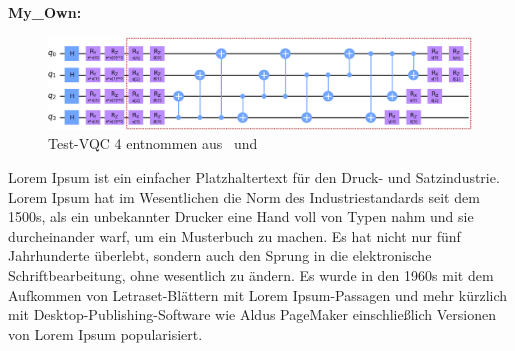 \textbf{My\_Own:}
\begin{figure}[htb]
    \includegraphics[width=16cm]{lib/graphics/paper_4.png}
    \caption*{Test-\ac{VQC} 4 entnommen aus~\cite{Sim2019} und ~\cite{Chen2022}}
    \label{abb:paper4}
\end{figure}


\label{q_visual}
Lorem Ipsum ist ein einfacher Platzhaltertext für den Druck- und Satzindustrie. Lorem Ipsum hat im Wesentlichen die Norm des Industriestandards seit dem 1500s, als ein unbekannter Drucker eine Hand voll von Typen nahm und sie durcheinander warf, um ein Musterbuch zu machen. Es hat nicht nur fünf Jahrhunderte überlebt, sondern auch den Sprung in die elektronische Schriftbearbeitung, ohne wesentlich zu ändern. Es wurde in den 1960s mit dem Aufkommen von Letraset-Blättern mit Lorem Ipsum-Passagen und mehr kürzlich mit Desktop-Publishing-Software wie Aldus PageMaker einschließlich Versionen von Lorem Ipsum popularisiert.



\newpage